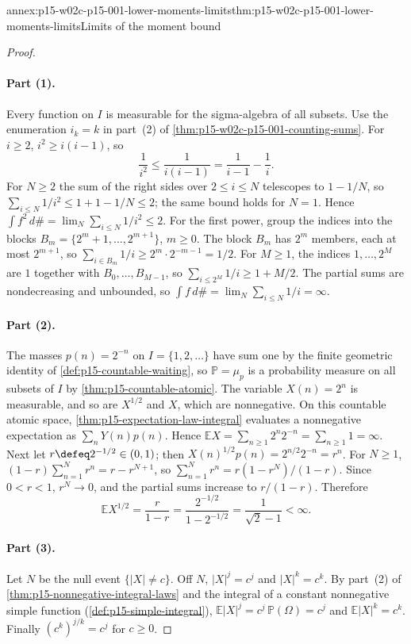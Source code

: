 \begin{annexitem}{annex:p15-w02c-p15-001-lower-moments-limits}{thm:p15-w02c-p15-001-lower-moments-limits}{Limits of the moment bound}
\begin{proof}
\paragraph{Part (1).}
Every function on \(I\) is measurable for the sigma-algebra of all subsets.
Use the enumeration \(i_k=k\) in part~(2) of
\cref{thm:p15-w02c-p15-001-counting-sums}. For \(i\geq2\),
\(i^2\geq i(i-1)\), so
\[
 \frac1{i^2}\leq\frac1{i(i-1)}=\frac1{i-1}-\frac1i .
\]
For \(N\geq2\) the sum of the right sides over \(2\leq i\leq N\)
telescopes to \(1-1/N\), so
\(\sum_{i\leq N}1/i^2\leq1+1-1/N\leq2\); the same bound holds for
\(N=1\). Hence \(\int f^2\,d\#=\lim_N\sum_{i\leq N}1/i^2\leq2\).
For the first power, group the indices into the blocks
\(B_m=\{2^m+1,\ldots,2^{m+1}\}\), \(m\geq0\). The block \(B_m\) has
\(2^m\) members, each at most \(2^{m+1}\), so
\(\sum_{i\in B_m}1/i\geq2^m\cdot2^{-m-1}=1/2\). For \(M\geq1\), the
indices \(1,\ldots,2^M\) are \(1\) together with \(B_0,\ldots,B_{M-1}\),
so \(\sum_{i\leq2^M}1/i\geq1+M/2\). The partial sums are nondecreasing
and unbounded, so \(\int f\,d\#=\lim_N\sum_{i\leq N}1/i=\infty\).

\paragraph{Part (2).}
The masses \(p(n)=2^{-n}\) on \(I=\{1,2,\ldots\}\) have sum one by the
finite geometric identity of \cref{def:p15-countable-waiting}, so
\(\mathbb P=\mu_p\) is a probability measure on all subsets of \(I\) by
\cref{thm:p15-countable-atomic}. The variable \(X(n)=2^n\) is measurable,
and so are \(X^{1/2}\) and \(X\), which are nonnegative. On this countable
atomic space, \cref{thm:p15-expectation-law-integral} evaluates a
nonnegative expectation as \(\sum_nY(n)p(n)\). Hence
\(\mathbb EX=\sum_{n\geq1}2^n2^{-n}=\sum_{n\geq1}1=\infty\). Next let
\(r\defeq2^{-1/2}\in(0,1)\); then
\(X(n)^{1/2}p(n)=2^{n/2}2^{-n}=r^n\). For \(N\geq1\),
\((1-r)\sum_{n=1}^Nr^n=r-r^{N+1}\), so
\(\sum_{n=1}^Nr^n=r(1-r^N)/(1-r)\). Since \(0<r<1\), \(r^N\to0\), and the
partial sums increase to \(r/(1-r)\). Therefore
\[
 \mathbb EX^{1/2}=\frac r{1-r}=\frac{2^{-1/2}}{1-2^{-1/2}}
 =\frac1{\sqrt2-1}<\infty .
\]

\paragraph{Part (3).}
Let \(N\) be the null event \(\{|X|\neq c\}\). Off \(N\),
\(|X|^j=c^j\) and \(|X|^k=c^k\). By part~(2) of
\cref{thm:p15-nonnegative-integral-laws} and the integral of a constant
nonnegative simple function (\cref{def:p15-simple-integral}), \(\mathbb E|X|^j=c^j\,\mathbb P(\Omega)=c^j\)
and \(\mathbb E|X|^k=c^k\). Finally \((c^k)^{j/k}=c^j\) for \(c\geq0\).
\end{proof}
\end{annexitem}

